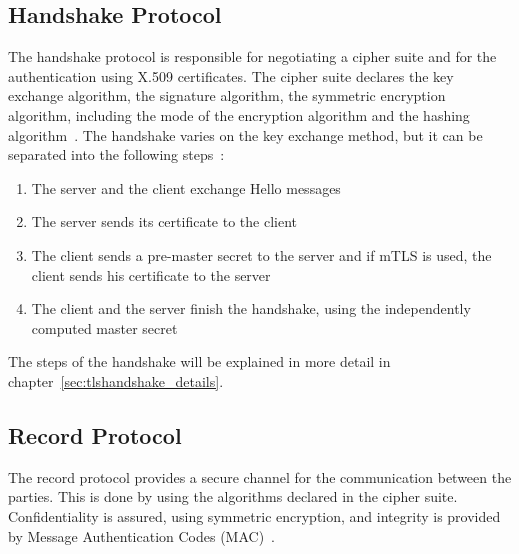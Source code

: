 \subsection{Handshake Protocol}
The handshake protocol is responsible for negotiating a cipher suite and for the authentication using X.509 certificates.
The cipher suite declares the key exchange algorithm, the signature algorithm, the symmetric encryption algorithm, including the mode of the encryption algorithm and the hashing algorithm~\cite{turnertls, kurbatov2021design}.
The handshake varies on the key exchange method, but it can be separated into the following steps~\cite{krawczyk2013security}:
\begin{enumerate}
    \item The server and the client exchange Hello messages
    \item The server sends its certificate to the client
    \item The client sends a pre-master secret to the server and if mTLS is used, the client sends his certificate to the server
    \item The client and the server finish the handshake, using the independently computed master secret
\end{enumerate}
The steps of the handshake will be explained in more detail in chapter~\ref{sec:tlshandshake_details}.


\subsection{Record Protocol}
The record protocol provides a secure channel for the communication between the parties.
This is done by using the algorithms declared in the cipher suite.
Confidentiality is assured, using symmetric encryption, and integrity is provided by Message Authentication Codes (MAC)~\cite{kurbatov2021design, krawczyk2013security}.


